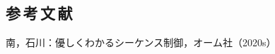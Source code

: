 \newpage
\begin{center}
	\section*{参\,考\,文\,献}                      %
\end{center}

\begin{thebibliography}{8}
	 南，石川：優しくわかるシーケンス制御，オーム社（2020s）
\end{thebibliography}

